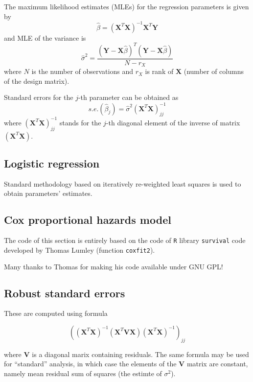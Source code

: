 \documentclass[12pt]{article}
\begin{document}
The maximum likelihood estimates (MLEs) for the regression parameters 
is given by
\begin{equation}
\hat{\beta} = (\mathbf{X}^T \mathbf{X})^{-1} \mathbf{X}^T \mathbf{Y}
\end{equation}
and MLE of the variance is
\begin{equation}
\hat{\sigma}^2 = \frac{(\mathbf{Y} - \mathbf{X}\hat{\beta})^T (\mathbf{Y} - \mathbf{X}\hat{\beta})}
			{N-r_X}
\end{equation}
where $N$ is the number of observations and $r_X$ is rank of $\mathbf{X}$ 
(number of columns of the design matrix). 

Standard errors for the $j$-{th} parameter can be obtained as 
\begin{equation}
s.e.(\hat{\beta}_j) = \hat{\sigma}^2 (\mathbf{X}^T\mathbf{X})^{-1}_{jj}
\end{equation}
where $(\mathbf{X}^T\mathbf{X})^{-1}_{jj}$ stands for the $j$-th diagonal 
element of the inverse of matrix $(\mathbf{X}^T\mathbf{X})$.

\subsection{Logistic regression}

Standard methodology based on iteratively re-weighted least squares is 
used to obtain parameters' estimates. 

\subsection{Cox proportional hazards model}

The code of this section is entirely based on the code of \texttt{R} 
library \texttt{survival} code developed by Thomas Lumley 
(function \texttt{coxfit2}). 

Many thanks to Thomas for making his code available under GNU GPL!

\subsection{Robust standard errors}

These are computed using formula

$$
((\mathbf{X}^T\mathbf{X})^{-1} (\mathbf{X}^T\mathbf{V}\mathbf{X})
(\mathbf{X}^T\mathbf{X})^{-1})_{jj} $$

where $\mathbf{V}$ is a diagonal marix containing residuals. The 
same formula may be used for ``standard'' analysis, in which case
the elements of the $\mathbf{V}$ matrix are constant, namely mean 
residual sum of squares (the estimte of $\sigma^2$).
\end{document}
